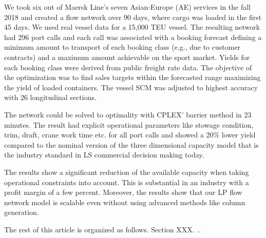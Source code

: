 We took six out of Maersk Line's seven Asian-Europe (AE) services in the fall 2018 and created a flow network over 90 days, where cargo was loaded in the first 45 days. We used real vessel data for a 15,000 TEU vessel. The resulting network had 296 port calls and each call was associated with a booking forecast defining a minimum amount to transport of each booking class (e.g., due to customer contracts) and a maximum amount achievable on the sport market. Yields for each booking class were derived from public freight rate data. The objective of the optimization was to find sales targets within the forecasted range maximizing the yield of loaded containers. The vessel SCM was adjusted to highest accuracy with 26 longitudinal sections. 

The network could be solved to optimality with CPLEX' barrier method in 23 minutes. The result had explicit operational parameters like stowage condition, trim, draft, crane work time etc. for all port calls and showed a 20\% lower yield compared to the nominal version of the three dimensional capacity model that is the industry standard in LS commercial decision making today.  

The results show a significant reduction of the available capacity when taking operational constraints into account. This is substantial in an industry with a profit margin of a few percent. Moreover, the results show that our LP flow network model is scalable even without using advanced methods like column generation. 

The rest of this article is organized as follows. Section XXX. ..